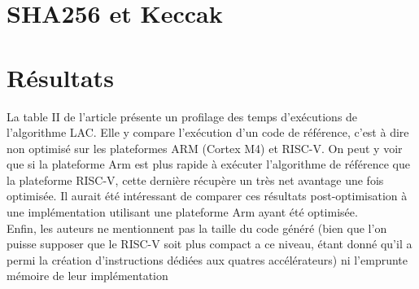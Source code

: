 \documentclass[10pt,a4paper]{article}
\begin{document}
\section{SHA256 et Keccak}




\section{Résultats}
La table II de l'article présente un profilage des temps d'exécutions de l'algorithme LAC. Elle y compare l'exécution d'un code de référence, c'est à dire non optimisé sur les plateformes
 ARM (Cortex M4) et RISC-V. On peut y voir que si la plateforme Arm est plus rapide à exécuter l'algorithme de référence que la plateforme RISC-V, cette dernière récupère un très net avantage 
une fois optimisée. Il aurait été intéressant de comparer ces résultats post-optimisation à une implémentation utilisant une plateforme Arm ayant été optimisée.\\

Enfin, les auteurs ne mentionnent pas la taille du code généré (bien que l'on puisse supposer que le RISC-V soit plus compact a ce niveau, étant donné qu'il a permi la création d'instructions 
dédiées aux quatres accélérateurs) ni l'emprunte mémoire de leur implémentation
\end{document}
